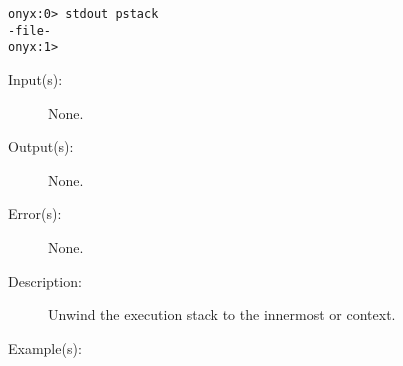 \begin{description}
\begin{description}
\begin{verbatim}
onyx:0> stdout pstack
-file-
onyx:1>
		\end{verbatim}
	\end{description}
\label{systemdict:stop}
\item[{\onyxop{--}{stop}{--}}: ]
	\begin{description}\item[]
	\item[Input(s): ] None.
	\item[Output(s): ] None.
	\item[Error(s): ] None.
	\item[Description: ]
		Unwind the execution stack to the innermost
		 or
		 context.
	\item[Example(s): ]\begin{verbatim}


\end{verbatim}
\end{description}
\end{description}
